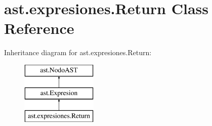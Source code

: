 \hypertarget{classast_1_1expresiones_1_1_return}{}\section{ast.\+expresiones.\+Return Class Reference}
\label{classast_1_1expresiones_1_1_return}
Inheritance diagram for ast.\+expresiones.\+Return\+:\begin{figure}[H]
\begin{center}
\leavevmode
\includegraphics[height=3.000000cm]{classast_1_1expresiones_1_1_return}
\end{center}
\end{figure}
